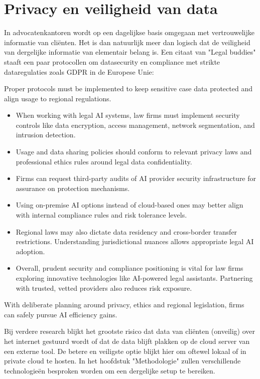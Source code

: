 \section{Privacy en veiligheid  van data}
In advocatenkantoren wordt op een dagelijkse basis omgegaan met vertrouwelijke informatie van cliënten. Het is dan natuurlijk meer dan logisch dat de veiligheid van dergelijke informatie van
elementair belang is. Een citaat van "Legal buddies" staaft een paar protocollen om datasecurity en compliance met strikte dataregulaties zoals GDPR in de Europese Unie:

\begin{displayquote}
	Proper protocols must be implemented to keep sensitive case data protected and align usage to regional regulations.
	\begin{itemize}
		\item When working with legal AI systems, law firms must implement security controls like data encryption, access management, network segmentation, and intrusion detection.
		\item Usage and data sharing policies should conform to relevant privacy laws and professional ethics rules around legal data confidentiality.
		\item Firms can request third-party audits of AI provider security infrastructure for assurance on protection mechanisms.
		\item Using on-premise AI options instead of cloud-based ones may better align with internal compliance rules and risk tolerance levels.
		\item Regional laws may also dictate data residency and cross-border transfer restrictions. Understanding jurisdictional nuances allows appropriate legal AI adoption.
		\item Overall, prudent security and compliance positioning is vital for law firms exploring innovative technologies like AI-powered legal assistants. Partnering with trusted, vetted providers also reduces risk exposure.
	\end{itemize}

	With deliberate planning around privacy, ethics and regional legislation, firms can safely pursue AI efficiency gains.\autocite{LegalBuddies}
\end{displayquote}

Bij verdere research blijkt het grootste risico dat data van cliënten (onveilig) over het internet gestuurd wordt of dat de data blijft plakken op de cloud server van een externe tool.
De betere en veiligste optie blijkt hier om oftewel lokaal of in private cloud te hosten. In het hoofdstuk "Methodologie" zullen verschillende technologieën besproken worden om een dergelijke
setup te bereiken.

